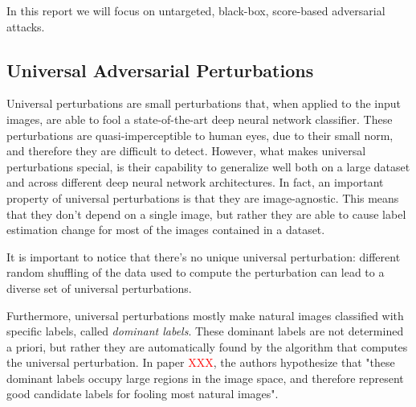 


In this report we will focus on untargeted, black-box, score-based adversarial attacks.

\subsection{Universal Adversarial Perturbations}
Universal perturbations are small perturbations that, when applied to the input images, are able
to fool a state-of-the-art deep neural network classifier. These perturbations are quasi-imperceptible to human eyes,
due to their small norm, and therefore they are difficult to detect. However, what makes universal perturbations special,
is their capability to generalize well both on a large dataset and across different deep neural network architectures.
In fact, an important property of universal perturbations is that they are image-agnostic. This means that
they don't depend on a single image, but rather they are able to cause label estimation change for most of
the images contained in a dataset.

It is important to notice that there's no unique universal perturbation: different random shuffling of the data used
to compute the perturbation can lead to a diverse set of universal perturbations.

Furthermore, universal perturbations mostly make natural images classified with specific labels, called
\textit{dominant labels}. These dominant labels are not determined a priori, but rather they are automatically
found by the algorithm that computes the universal perturbation. In paper \textcolor{red}{XXX}, the authors
hypothesize that "these dominant labels occupy large regions in the image space, and therefore represent good
candidate labels for fooling most natural images".

